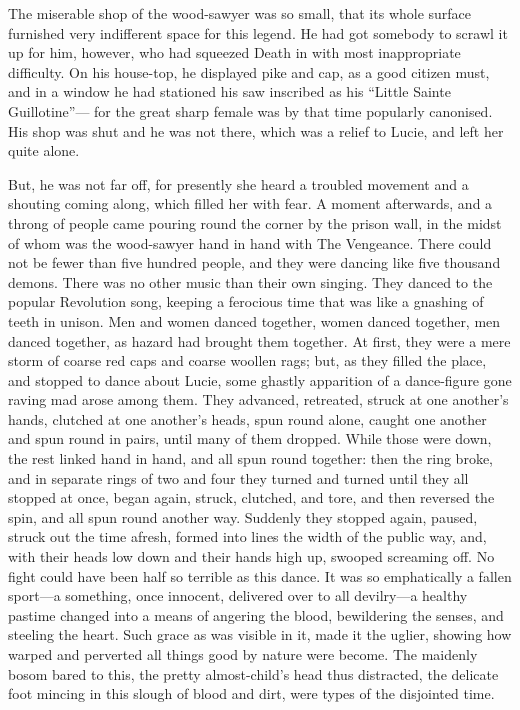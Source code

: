 The miserable shop of the wood-sawyer was so small, that its whole
surface furnished very indifferent space for this legend.  He had got
somebody to scrawl it up for him, however, who had squeezed Death in
with most inappropriate difficulty.  On his house-top, he displayed
pike and cap, as a good citizen must, and in a window he had
stationed his saw inscribed as his ``Little Sainte Guillotine''---%
for the great sharp female was by that time popularly canonised.
His shop was shut and he was not there, which was a relief to Lucie,
and left her quite alone.

But, he was not far off, for presently she heard a troubled movement
and a shouting coming along, which filled her with fear.  A moment
afterwards, and a throng of people came pouring round the corner by
the prison wall, in the midst of whom was the wood-sawyer hand in
hand with The Vengeance.  There could not be fewer than five hundred
people, and they were dancing like five thousand demons.  There was
no other music than their own singing.  They danced to the popular
Revolution song, keeping a ferocious time that was like a gnashing of
teeth in unison.  Men and women danced together, women danced
together, men danced together, as hazard had brought them together.
At first, they were a mere storm of coarse red caps and coarse
woollen rags; but, as they filled the place, and stopped to dance
about Lucie, some ghastly apparition of a dance-figure gone raving
mad arose among them.  They advanced, retreated, struck at one
another's hands, clutched at one another's heads, spun round alone,
caught one another and spun round in pairs, until many of them
dropped.  While those were down, the rest linked hand in hand, and
all spun round together:  then the ring broke, and in separate rings
of two and four they turned and turned until they all stopped at
once, began again, struck, clutched, and tore, and then reversed the
spin, and all spun round another way.  Suddenly they stopped again,
paused, struck out the time afresh, formed into lines the width of
the public way, and, with their heads low down and their hands high
up, swooped screaming off.  No fight could have been half so terrible
as this dance.  It was so emphatically a fallen sport---a something,
once innocent, delivered over to all devilry---a healthy pastime
changed into a means of angering the blood, bewildering the senses,
and steeling the heart.  Such grace as was visible in it, made it the
uglier, showing how warped and perverted all things good by nature
were become.  The maidenly bosom bared to this, the pretty
almost-child's head thus distracted, the delicate foot mincing in
this slough of blood and dirt, were types of the disjointed time.


